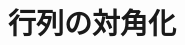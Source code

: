 \documentclass[../../topic_linear-algebra]{subfiles}
\begin{document}
\chapter{行列の対角化}



\end{document}
